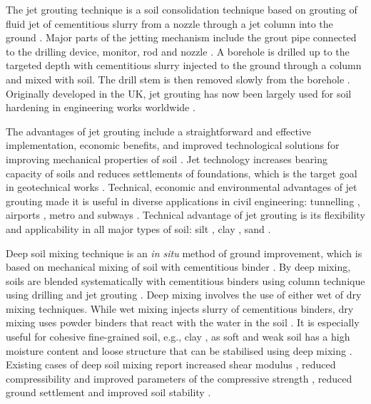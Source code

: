 \documentclass[USenglish,twocolumn]{article}
\begin{document}
The jet grouting technique is a soil consolidation technique based on grouting of fluid jet of cementitious slurry from a nozzle through a jet column into the ground \cite{Mosiici}. Major parts of the jetting mechanism include the grout pipe connected to the drilling device, monitor, rod and nozzle \cite{CovilSkinner}. A borehole is drilled up to the targeted depth with cementitious slurry injected to the ground through a column and mixed with soil. The drill stem is then removed slowly from the borehole \cite{Njock}. Originally developed in the UK, jet grouting has now been largely used for soil hardening in engineering works worldwide \cite{Morey,Yoshida,Lunardi}. 

The advantages of jet grouting include a straightforward and effective implementation, economic benefits, and improved technological solutions for improving mechanical properties of soil \cite{modoni2012analysis}. Jet technology increases bearing capacity of soils and reduces settlements of foundations, which is the target goal in geotechnical works \cite{ModoniBzowka}. Technical, economic and environmental advantages of jet grouting \cite{Pinto} made it is useful in diverse applications in civil engineering: tunnelling \cite{Croce}, airports \cite{Hamidi,Lewis}, metro and subways \cite{Farretal2012,Chuetal,Mihalis}. Technical advantage of jet grouting is its flexibility \cite{Newman} and applicability in all major types of soil: silt \cite{Chuetal2012,HoHu}, clay \cite{Hoetal2005,Ho2009}, sand \cite{Hanetal2012}.

Deep soil mixing technique is an \emph{in situ} method of ground improvement, which is based on mechanical mixing of soil with cementitious binder \cite{Kitazume,PorbahaetalA}. By deep mixing, soils are blended systematically with cementitious binders using column technique using drilling and jet grouting \cite{Larssonetal2015,Larsson}. Deep mixing involves the use of either wet of dry mixing techniques. While wet mixing injects slurry of cementitious binders, dry mixing uses powder binders that react with the water in the soil \cite{PorbahaetalB}. It is especially useful for cohesive fine-grained soil, e.g., clay \cite{Dahlstroem,Xieetal2012}, as soft and weak soil has a high moisture content and loose structure that can be stabilised using deep mixing \cite{PorbahaetalC}. Existing cases of deep soil mixing report increased shear modulus \cite{Fangetal2001}, reduced compressibility and improved parameters of the compressive strength \cite{Mypati}, reduced ground settlement and improved soil stability \cite{Bergado}.
\end{document}
